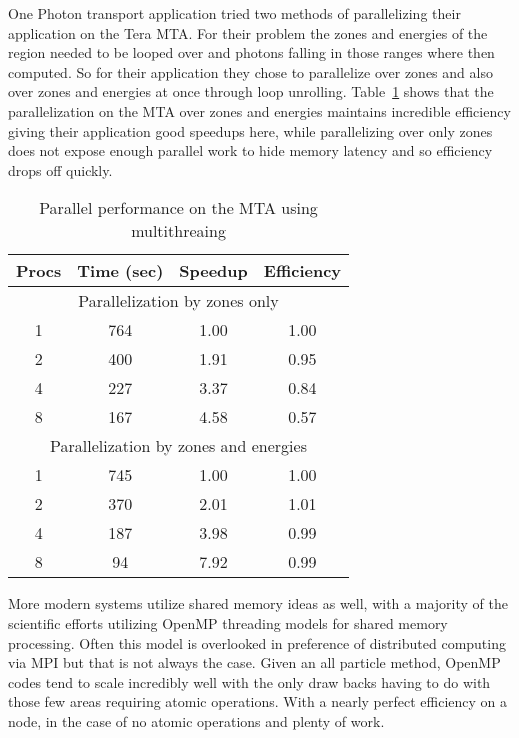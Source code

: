 %
One Photon transport application tried two methods of parallelizing their application on the Tera MTA. 
%
For their problem the zones and energies of the region needed to be looped over and photons falling in those ranges where then computed.
%
So for their application they chose to parallelize over zones and also over zones and energies at once through loop unrolling.
%
Table~\ref{tab:MTAPerf} shows that the parallelization on the MTA over zones and energies maintains incredible efficiency giving their application good speedups here, while parallelizing over only zones does not expose enough parallel work to hide memory latency and so efficiency drops off quickly.
%
\begin{table}
\caption {Parallel performance on the MTA using multithreaing} \label{tab:MTAPerf} 
\begin{center}
\begin{tabular}{|c|c|c|c|}
\hline
Procs & Time (sec) & Speedup & Efficiency \\
\hline
\multicolumn{4}{|c|}{Parallelization by zones only} \\
\hline
1 & 764 & 1.00 & 1.00 \\
\hline
2 & 400 & 1.91 & 0.95 \\
\hline
4 & 227 & 3.37 & 0.84 \\
\hline
8 & 167 & 4.58 & 0.57 \\
\hline
\multicolumn{4}{|c|}{Parallelization by zones and energies} \\
\hline
1 & 745 & 1.00 & 1.00 \\
\hline
2 & 370 & 2.01 & 1.01 \\
\hline
4 & 187 & 3.98 & 0.99 \\
\hline
8 & 94 & 7.92 & 0.99 \\
\hline
\end{tabular}
\end{center}
\end{table}

More modern systems utilize shared memory ideas as well, with a majority of the scientific efforts utilizing OpenMP threading models for shared memory processing.
%
Often this model is overlooked in preference of distributed computing via MPI but that is not always the case.
%
Given an all particle method, OpenMP codes tend to scale incredibly well with the only draw backs having to do with those few areas requiring atomic operations.
%
With a nearly perfect efficiency on a node, in the case of no atomic operations and plenty of work.

